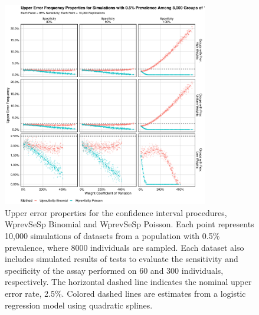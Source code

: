 \begin{figure}
\centering
\includegraphics[width=0.8\textwidth]{imperfect_upper_error_frequency_8000_groups_0_005_prev}
\caption{Upper error properties for the confidence interval procedures, WprevSeSp Binomial and WprevSeSp Poisson.
Each point represents 10,000 simulations of datasets from a population with 0.5\% prevalence, where 8000 individuals are sampled.
Each dataset also includes simulated results of tests to evaluate the sensitivity and specificity of the assay performed on 60 and 300 individuals, respectively.
The horizontal dashed line indicates the nominal upper error rate, 2.5\%.
Colored dashed lines are estimates from a logistic regression model using quadratic splines.}
\label{ch_3:fig:imperfect_upper_error_frequency_8000_groups_0_005_prev}
\end{figure}

